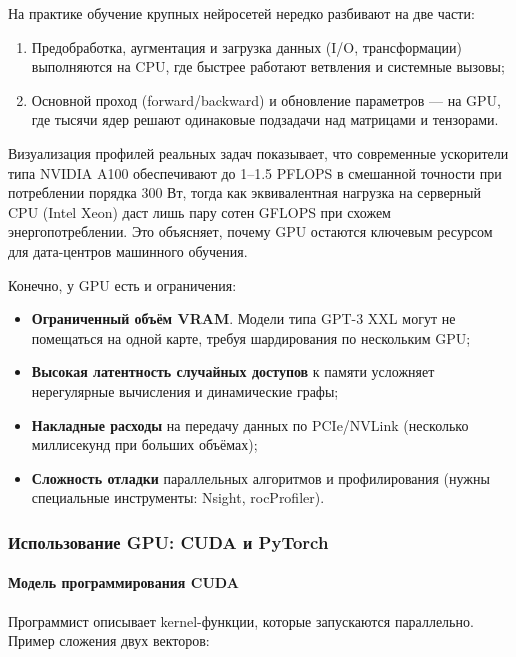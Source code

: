 На практике обучение крупных нейросетей нередко разбивают на две части:  
\begin{enumerate}  
  \item Предобработка, аугментация и загрузка данных (I/O, трансформации) выполняются на CPU, где быстрее работают ветвления и системные вызовы;
  \item Основной проход (forward/backward) и обновление параметров — на GPU, где тысячи ядер решают одинаковые подзадачи над матрицами и тензорами.  
\end{enumerate}  

Визуализация профилей реальных задач показывает, что современные ускорители типа NVIDIA A100 обеспечивают до 1–1.5 PFLOPS в смешанной точности при потреблении порядка 300 Вт, тогда как эквивалентная нагрузка на серверный CPU (Intel Xeon) даст лишь пару сотен GFLOPS при схожем энергопотреблении. Это объясняет, почему GPU остаются ключевым ресурсом для дата-центров машинного обучения.  

Конечно, у GPU есть и ограничения:  
\begin{itemize}  
  \item \textbf{Ограниченный объём VRAM}. Модели типа GPT-3 XXL могут не помещаться на одной карте, требуя шардирования по нескольким GPU;
  \item \textbf{Высокая латентность случайных доступов} к памяти усложняет нерегулярные вычисления и динамические графы;
  \item \textbf{Накладные расходы} на передачу данных по PCIe/NVLink (несколько миллисекунд при больших объёмах);
  \item \textbf{Сложность отладки} параллельных алгоритмов и профилирования (нужны специальные инструменты: Nsight, rocProfiler).  
\end{itemize}  


\subsubsection{Использование GPU: CUDA и PyTorch}
\label{sec:tools_gpu}

\paragraph{Модель программирования CUDA}
Программист описывает kernel-функции, которые запускаются параллельно. Пример сложения двух векторов:

